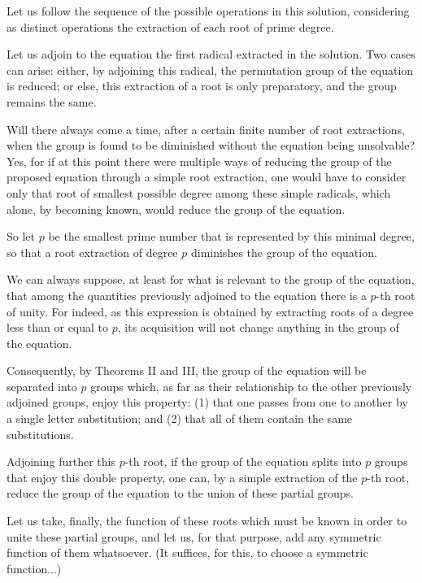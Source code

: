 \documentclass{article}
\begin{document}
Let us follow the sequence of the possible operations in this solution, considering as distinct operations the extraction of each root of prime degree.

Let us adjoin to the equation the first radical extracted in the solution. Two cases can arise: either, by adjoining this radical, the permutation group of the equation is reduced; or else, this extraction of a root is only preparatory, and the group remains the same.

Will there always come a time, after a certain finite number of root extractions, when the group is found to be diminished without the equation being unsolvable? Yes, for if at this point there were multiple ways of reducing the group of the proposed equation through a simple root extraction, one would have to consider only that root of smallest possible degree among these simple radicals, which alone, by becoming known, would reduce the group of the equation.

So let $p$ be the smallest prime number that is represented by this minimal degree, so that a root extraction of degree $p$ diminishes the group of the equation.

We can always suppose, at least for what is relevant to the group of the equation, that among the quantities previously adjoined to the equation there is a $p$-th root of unity. For indeed, as this expression is obtained by extracting roots of a degree less than or equal to $p$, its acquisition will not change anything in the group of the equation.

Consequently, by Theorems II and III, the group of the equation will be separated into $p$ groups which, as far as their relationship to the other previously adjoined groups, enjoy this property: (1) that one passes from one to another by a single letter substitution; and (2) that all of them contain the same substitutions.

Adjoining further this $p$-th root, if the group of the equation splits into $p$ groups that enjoy this double property, one can, by a simple extraction of the $p$-th root, reduce the group of the equation to the union of these partial groups.

Let us take, finally, the function of these roots which must be known in order to unite these partial groups, and let us, for that purpose, add any symmetric function of them whatsoever. (It suffices, for this, to choose a symmetric function...) 
\end{document}
